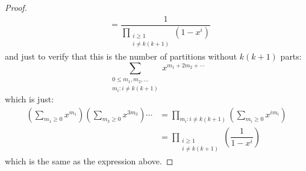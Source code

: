 \documentclass{article}
\begin{document}
\begin{proof}
\begin{align*}
                                                                                                                     &= \dfrac{1}{\prod_{\substack{i\geq 1 \\ i \neq k(k + 1)}}(1 - x^{i})}       
            \end{align*}
        and just to verify that this is the number of partitions without $k(k + 1)$ parts:
            \begin{equation*}
                \sum_{\substack{0 \leq m_{1}, m_{2}, \ldots \\ m_{i} : i \neq k(k + 1)}}x^{m_{1} + 2m_{2} + \cdots }
            \end{equation*}
        which is just:
            \begin{align*}
                \left(\sum_{m_{1}\geq 0}x^{m_{1}}\right)\left(\sum_{m_{3}\geq 0}x^{3m_{3}}\right)\cdots  &= \prod_{m_{i} : i \neq k(k + 1)}\left(\sum_{m_{i}\geq 0}x^{im_{i}}\right)       \\
                                                                                                         &= \prod_{\substack{i \geq 1 \\ i \neq k(k + 1)}}\left(\dfrac{1}{1 - x^{i}}\right)   
            \end{align*}
        which is the same as the expression above.
    \end{proof}
\end{document}
